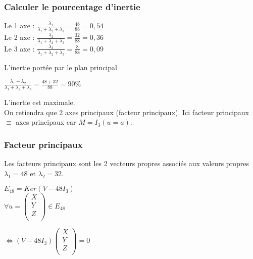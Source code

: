 \documentclass[a4paper, 12pt]{article}
\begin{document}
\subsubsection{Calculer le pourcentage d'inertie}
\begin{flushleft}
Le 1 axe : $\frac{\lambda_1}{\lambda_1 + \lambda_2 + \lambda_3} = \frac{48}{88} = 0,54$ \\
Le 2 axe : $\frac{\lambda_2}{\lambda_1 + \lambda_2 + \lambda_3} = \frac{32}{88} = 0,36$ \\
Le 3 axe : $\frac{\lambda_3}{\lambda_1 + \lambda_2 + \lambda_3} = \frac{8}{88} = 0,09$ \\
\end{flushleft}

\begin{flushleft}
L'inertie portée par le plan principal
\end{flushleft}
\begin{center}
$\frac{\lambda_1 + \lambda_2}{\lambda_1 + \lambda_2 + \lambda_3} = \frac{48 + 32}{88} = 90\%$
\end{center}

\begin{flushleft}
L'inertie est maximale. \\

On retiendra que 2 axes principaux (facteur principaux). Ici facteur principaux $\equiv$ axes principaux car $M = I_3 (u = a)$.
\end{flushleft}


\subsubsection{Facteur principaux}
Les facteurs principaux sont les 2 vecteurs propres associés aux valeurs propres $\lambda_1 = 48$ et $\lambda_2 = 32$.

\begin{center}
$E_{48} = Ker(V - 48I_3)$ \\

$\forall u =
\begin{pmatrix}
X \\
Y \\
Z \\
\end{pmatrix}
\in E_{48}$
\end{center}

\begin{center}
$ \Leftrightarrow (V - 48I_3)
\begin{pmatrix}
X \\
Y \\
Z \\
\end{pmatrix}
= 0$
\end{center}
\end{document}
